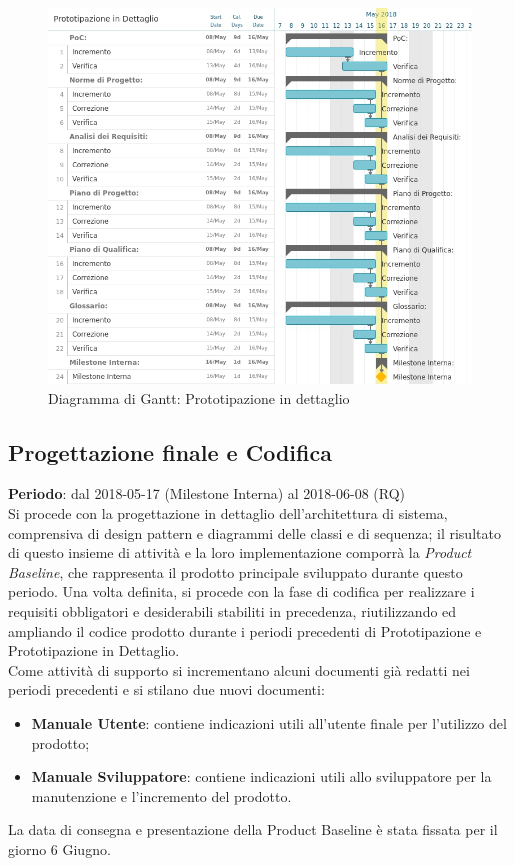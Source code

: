 \begin{figure}[h!]
	\centerline{\includegraphics[scale=0.55]{img/DiagrammiGantt/PrototipazioneDettaglio.jpg}}
	\caption{Diagramma di Gantt: Prototipazione in dettaglio}
	\label{fig:gantt_prot_dett}
\end{figure}
\clearpage

\subsection{Progettazione finale e Codifica}
\textbf{Periodo}: dal 2018-05-17 (Milestone Interna) al 2018-06-08 (RQ)\\

Si procede con la progettazione in dettaglio dell'architettura di sistema, comprensiva di design pattern e diagrammi delle classi e di sequenza; il risultato di questo insieme di attività e la loro implementazione comporrà la \emph{Product Baseline}, che rappresenta il prodotto principale sviluppato durante questo periodo. Una volta definita, si procede con la fase di codifica per realizzare i requisiti obbligatori e desiderabili stabiliti in precedenza, riutilizzando ed ampliando il codice prodotto durante i periodi precedenti di Prototipazione e Prototipazione in Dettaglio. \\
Come attività di supporto si incrementano alcuni documenti già redatti nei periodi precedenti e si stilano due nuovi documenti:
\begin{itemize}
	\item \textbf{Manuale Utente}: contiene indicazioni utili all'utente finale per l'utilizzo del prodotto;
	\item \textbf{Manuale Sviluppatore}: contiene indicazioni utili allo sviluppatore per la manutenzione e l'incremento del prodotto.
\end{itemize}
La data di consegna e presentazione della Product Baseline è stata fissata per il giorno 6 Giugno.

